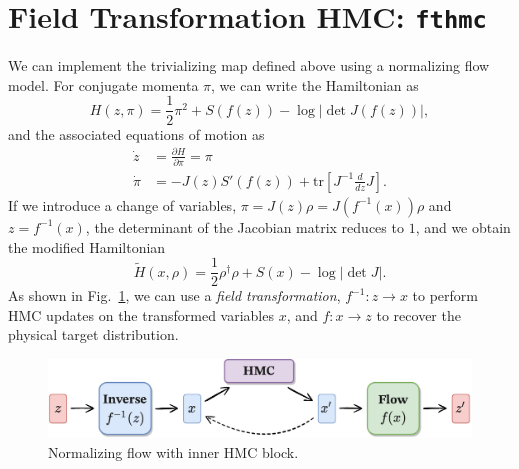 \documentclass[a4paper,11pt]{article}
\begin{document}
\section{\label{sec:hmc_nf}Field Transformation HMC: \texttt{fthmc}}
%
We can implement the trivializing map defined above using a normalizing flow
model.
%
For conjugate momenta \(\pi\), we can write the Hamiltonian as
%
\begin{equation}
    H(z, \pi) = \frac{1}{2}\pi^{2} + S(f(z)) - \log\left|\det J(f(z))\right|,
\end{equation}
%
and the associated equations of motion as
%
\begin{align}
    \dot{z} &= \frac{\partial H}{\partial \pi} = \pi \\
    \dot{\pi} &= -J(z) S'(f(z)) + \mathrm{tr}\left[ J^{-1}\frac{d}{dz} J \right].
\end{align}
%
If we introduce a change of variables, \(\pi = J(z)\rho = J(f^{-1}(x))\rho\)
and \(z = f^{-1}(x)\), the determinant of the Jacobian matrix reduces to \(1\),
and we obtain the modified Hamiltonian
%
\begin{equation}
    \tilde{H}(x, \rho) = \frac{1}{2}\rho^{\dagger}\rho + S(x) - \log|\det J|.
\end{equation}
%
As shown in Fig.~\ref{fig:fthmc}, we can use a \emph{field transformation},
\(f^{-1}: z \rightarrow x\) to perform HMC updates on the transformed variables
\(x\), and \(f: x \rightarrow z\) to recover the physical target distribution.
%
\begin{figure}[htpb]
    \centering
    \includegraphics[width=\textwidth]{assets/fthmc.pdf}
    \caption{\label{fig:fthmc}Normalizing flow with inner HMC block.}
\end{figure}
%
\end{document}

